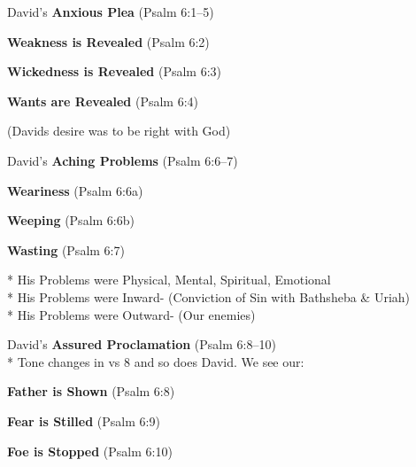 \begin{compactenum}[I.]
    \item David’s \textbf{ Anxious Plea}   (Psalm 6:1--5)
    \begin{compactenum}[A.]
    		\item \textbf{Weakness is Revealed}   (Psalm 6:2)
    		\item \textbf{Wickedness is Revealed}   (Psalm 6:3)
    		\item \textbf{Wants are Revealed}   (Psalm 6:4)
	\end{compactenum}
	(Davids desire was to be right with God)
    \item David’s \textbf{Aching Problems}   (Psalm 6:6--7)
    \begin{compactenum}[A.]
    		\item \textbf{Weariness}  (Psalm 6:6a)
    		\item \textbf{Weeping}  (Psalm 6:6b)
    		\item \textbf{Wasting}  (Psalm 6:7)
	\end{compactenum}
	* His Problems were Physical, Mental, Spiritual, Emotional\\
     * His Problems were Inward- (Conviction of Sin with Bathsheba \& Uriah)\\
     * His Problems were Outward- (Our enemies)
    \item David’s \textbf{Assured Proclamation}   (Psalm 6:8--10)\\
    * Tone changes in vs 8 and so does David. We see our:
    \begin{compactenum}[I.]
    \item \textbf{Father is Shown}   (Psalm 6:8)
    \item \textbf{Fear is Stilled}   (Psalm 6:9)
    \item \textbf{Foe is Stopped}   (Psalm 6:10)
\end{compactenum}
\end{compactenum}
